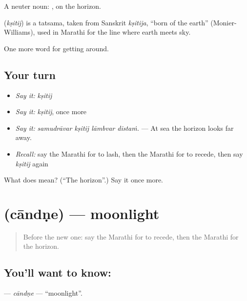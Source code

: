 A neuter noun: , on the horizon.

\begin{cousinweb}
\textbf{} (\emph{kṣitij}) is a tatsama, taken from Sanskrit \emph{kṣitija}, \textquotedblleft{}born of the earth\textquotedblright{} (Monier-Williams), used in Marathi for the line where earth meets sky.
\end{cousinweb}

\begin{grammarlens}[title={What you've built}]
One more word for getting around.
\end{grammarlens}

\subsection*{Your turn}
\begin{itemize}
\raggedright
  \item \emph{Say it:} \emph{kṣitij}
  \item \emph{Say it:} \emph{kṣitij}, once more
  \item \emph{Say it:} \emph{samudrāvar kṣitij lāmbvar distaṁ.} — At sea the horizon looks far away.
  \item \emph{Recall:} say the Marathi for to lash, then the Marathi for to recede, then say \emph{kṣitij} again
\end{itemize}

\begin{tcolorbox}[breakable,colback=teal!4,colframe=teal!35!black,title={Before you move on}]
What does  mean? (\textquotedblleft{}The horizon\textquotedblright{}.) Say it once more.
\end{tcolorbox}
\section[\texorpdfstring{\mr{चांदणे} (cāndṇe)}{चांदणे (cāndṇe)}]{ (cāndṇe) — moonlight}

\label{lesson:MR-C441-candne}



\begin{quote}
Before the new one: say the Marathi for to recede, then the Marathi for the horizon.
\end{quote}

\subsection*{You'll want to know: }
\textbf{} — \emph{cāndṇe} — \textquotedblleft{}moonlight\textquotedblright{}.

